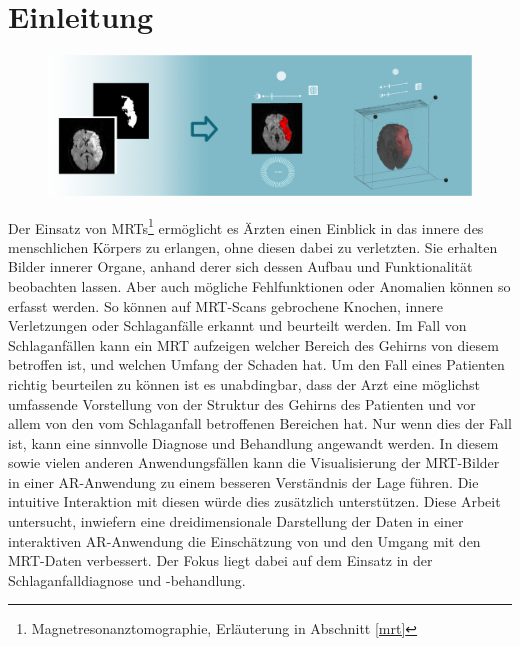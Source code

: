 %

\chapter{Einleitung}

\begin{figure}[!htb]
	\centering
	\includegraphics[width=1\linewidth]{images/teaser.png}
	\caption{}
	\label{img:teaser}
\end{figure}


Der Einsatz von MRTs\footnote{ Magnetresonanztomographie, Erläuterung in Abschnitt \ref{mrt}} ermöglicht es Ärzten einen Einblick in das innere des menschlichen Körpers zu erlangen, ohne diesen dabei zu verletzten. Sie erhalten Bilder innerer Organe, anhand derer sich dessen Aufbau und Funktionalität beobachten lassen. Aber auch mögliche Fehlfunktionen oder Anomalien können so erfasst werden. So können auf MRT-Scans gebrochene Knochen, innere Verletzungen oder Schlaganfälle erkannt und beurteilt werden. Im Fall von Schlaganfällen kann ein MRT aufzeigen welcher Bereich des Gehirns von diesem betroffen ist, und welchen Umfang der Schaden hat.
Um den Fall eines Patienten richtig beurteilen zu können ist es unabdingbar, dass der Arzt eine möglichst umfassende Vorstellung von der Struktur des Gehirns des Patienten und vor allem von den vom Schlaganfall betroffenen Bereichen hat. Nur wenn dies der Fall ist, kann eine sinnvolle Diagnose und Behandlung angewandt werden.
In diesem sowie vielen anderen Anwendungsfällen kann die Visualisierung der MRT-Bilder in einer AR-Anwendung zu einem besseren Verständnis der Lage führen. Die intuitive Interaktion mit diesen würde dies zusätzlich unterstützen. 
Diese Arbeit untersucht, inwiefern eine dreidimensionale Darstellung der Daten in einer interaktiven AR-Anwendung die Einschätzung von und den Umgang mit den MRT-Daten verbessert. Der Fokus liegt dabei auf dem Einsatz in der Schlaganfalldiagnose und -behandlung.  



